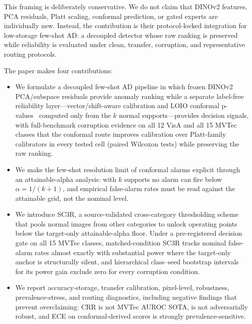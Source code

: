 This framing is deliberately conservative. We do not claim that DINOv2 features, PCA residuals, Platt scaling, conformal prediction, or gated experts are individually new. Instead, the contribution is their protocol-locked integration for low-storage few-shot AD: a decoupled detector whose raw ranking is preserved while reliability is evaluated under clean, transfer, corruption, and representative routing protocols.

The paper makes four contributions:
\begin{itemize}[leftmargin=*]
    \item We formulate a decoupled few-shot AD pipeline in which frozen DINOv2 PCA/subspace residuals provide anomaly ranking while a separate label-free reliability layer---vector/shift-aware calibration and LOIO conformal p-values~\cite{hennhofer2024loio} computed only from the $k$ normal supports---provides decision signals, with full-benchmark corruption evidence on all 12 VisA and all 15 MVTec classes that the conformal route improves calibration over Platt-family calibrators in every tested cell (paired Wilcoxon tests) while preserving the raw ranking.
    \item We make the few-shot resolution limit of conformal alarms explicit through an attainable-alpha analysis: with $k$ supports no alarm can fire below $\alpha=1/(k{+}1)$, and empirical false-alarm rates must be read against the attainable grid, not the nominal level.
    \item We introduce SC3R, a source-validated cross-category thresholding scheme that pools normal images from other categories to unlock operating points below the target-only attainable-alpha floor. Under a pre-registered decision gate on all 15 MVTec classes, matched-condition SC3R tracks nominal false-alarm rates almost exactly with substantial power where the target-only anchor is structurally silent, and hierarchical class--seed bootstrap intervals for its power gain exclude zero for every corruption condition.
    \item We report accuracy-storage, transfer calibration, pixel-level, robustness, prevalence-stress, and routing diagnostics, including negative findings that prevent overclaiming: CRR is not MVTec AUROC SOTA, is not adversarially robust, and ECE on conformal-derived scores is strongly prevalence-sensitive.
\end{itemize}
